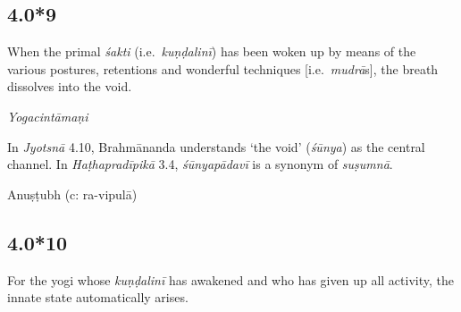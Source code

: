 \begin{ekdosis}



\subsection*{4.0*9}
\begin{translation}[hp04_000_9]
When the primal \emph{śakti} (i.e.~\emph{kuṇḍalinī}) has been woken up by means of the various postures, retentions and wonderful techniques [i.e.~\emph{mudrā}s], the breath dissolves into the void.
\end{translation}


\begin{testimonia}[hp04_000_9]
\emph{Yogacintāmaṇi}
\begin{versinnote}
\end{versinnote}
\end{testimonia}

\begin{philcomm}[hp04_000_9]
In \emph{Jyotsnā} 4.10, Brahmānanda understands `the void' (\emph{śūnya}) as the central channel. In \emph{Haṭhapradīpikā} 3.4, \emph{śūnyapādavī} is a synonym of \emph{suṣumnā}.
\end{philcomm}

\begin{metre}[hp04_000_9]
Anuṣṭubh (c: ra-vipulā)
\end{metre}

\subsection*{4.0*10}
\begin{translation}[hp04_000_10]
For the yogi whose \emph{kuṇḍalinī} has awakened and who has given up all activity, the innate state automatically arises.
\end{translation}


\end{ekdosis}
